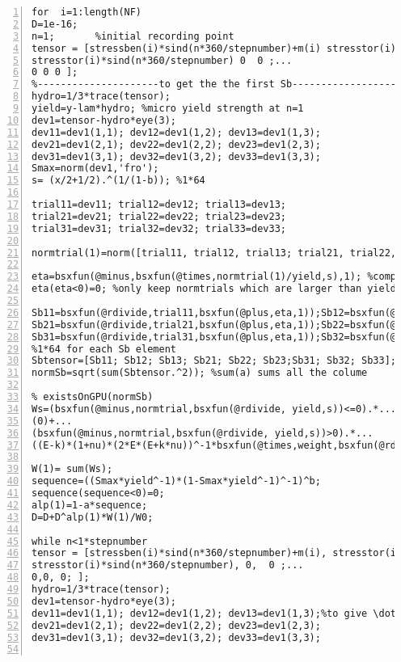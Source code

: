 \begin{lstlisting}[numbers=left, numberstyle=\tiny, keywordstyle=\color{blue!100}, commentstyle=\color{red!30!green!100!blue!100}, frame=shadowbox, rulesepcolor=\color{red!20!green!20!blue!20}]
for  i=1:length(NF)
D=1e-16;
n=1;       %initial recording point
tensor = [stressben(i)*sind(n*360/stepnumber)+m(i) stresstor(i)*sind(n*360/stepnumber) 0 ;...
stresstor(i)*sind(n*360/stepnumber) 0  0 ;...
0 0 0 ];
%---------------------to get the the first Sb-----------------------------
hydro=1/3*trace(tensor);
yield=y-lam*hydro; %micro yield strength at n=1
dev1=tensor-hydro*eye(3);
dev11=dev1(1,1); dev12=dev1(1,2); dev13=dev1(1,3);
dev21=dev1(2,1); dev22=dev1(2,2); dev23=dev1(2,3);
dev31=dev1(3,1); dev32=dev1(3,2); dev33=dev1(3,3);
Smax=norm(dev1,'fro');
s= (x/2+1/2).^(1/(1-b)); %1*64

trial11=dev11; trial12=dev12; trial13=dev13;
trial21=dev21; trial22=dev22; trial23=dev23;
trial31=dev31; trial32=dev32; trial33=dev33;

normtrial(1)=norm([trial11, trial12, trial13; trial21, trial22, trial23;trial31, trial32, trial33],'fro');

eta=bsxfun(@minus,bsxfun(@times,normtrial(1)/yield,s),1); %compare normtrial with yield/s
eta(eta<0)=0; %only keep normtrials which are larger than yield/s

Sb11=bsxfun(@rdivide,trial11,bsxfun(@plus,eta,1));Sb12=bsxfun(@rdivide,trial12,bsxfun(@plus,eta,1));Sb13=bsxfun(@rdivide,trial13,bsxfun(@plus,eta,1));
Sb21=bsxfun(@rdivide,trial21,bsxfun(@plus,eta,1));Sb22=bsxfun(@rdivide,trial22,bsxfun(@plus,eta,1));Sb23=bsxfun(@rdivide,trial23,bsxfun(@plus,eta,1));
Sb31=bsxfun(@rdivide,trial31,bsxfun(@plus,eta,1));Sb32=bsxfun(@rdivide,trial32,bsxfun(@plus,eta,1));Sb33=bsxfun(@rdivide,trial33,bsxfun(@plus,eta,1));
%1*64 for each Sb element
Sbtensor=[Sb11; Sb12; Sb13; Sb21; Sb22; Sb23;Sb31; Sb32; Sb33];
normSb=sqrt(sum(Sbtensor.^2)); %sum(a) sums all the colume

% existsOnGPU(normSb)
Ws=(bsxfun(@minus,normtrial,bsxfun(@rdivide, yield,s))<=0).*...
(0)+...
(bsxfun(@minus,normtrial,bsxfun(@rdivide, yield,s))>0).*...
((E-k)*(1+nu)*(2*E*(E+k*nu))^-1*bsxfun(@times,weight,bsxfun(@rdivide,bsxfun(@times,bsxfun(@minus,normtrial,bsxfun(@rdivide, yield,s)),yield),s)));

W(1)= sum(Ws);
sequence=((Smax*yield^-1)*(1-Smax*yield^-1)^-1)^b;
sequence(sequence<0)=0;
alp(1)=1-a*sequence;
D=D+D^alp(1)*W(1)/W0;

while n<1*stepnumber
tensor = [stressben(i)*sind(n*360/stepnumber)+m(i), stresstor(i)*sind(n*360/stepnumber), 0 ;...
stresstor(i)*sind(n*360/stepnumber), 0,  0 ;...
0,0, 0; ];
hydro=1/3*trace(tensor);
dev1=tensor-hydro*eye(3);
dev11=dev1(1,1); dev12=dev1(1,2); dev13=dev1(1,3);%to give \dot{dev\Sigma}dt
dev21=dev1(2,1); dev22=dev1(2,2); dev23=dev1(2,3);
dev31=dev1(3,1); dev32=dev1(3,2); dev33=dev1(3,3);


\end{lstlisting}
